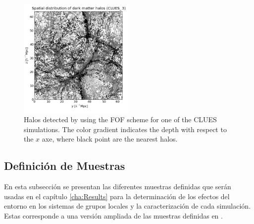 \begin{figure}[htbp]
	\centering
	\includegraphics[width=0.5\textwidth]
	{./figures/3_nbody_simulations/Halos_Spatial_Distribution(CLUES_16953).png}

	\caption{\small{Halos detected by using the FOF scheme for one of the 
	CLUES simulations. The color gradient indicates the depth with respect to 
	the	$x$ axe, where black point are the nearest halos.}}
	
	\label{fig:CLUES_FOF}
\end{figure}


	\subsection{Definición de Muestras}
	\label{subsec:SampleOfPairsToUse}
	

En esta subsección se presentan las diferentes muestras definidas que serán 
usadas en el capítulo \ref{cha:Results} para la determinación de los efectos 
del entorno en los sistemas de grupos locales y la caracterización de cada 
simulación. Estas corresponde a una versión ampliada de las muestras 
definidas en \cite{forero2011}.


